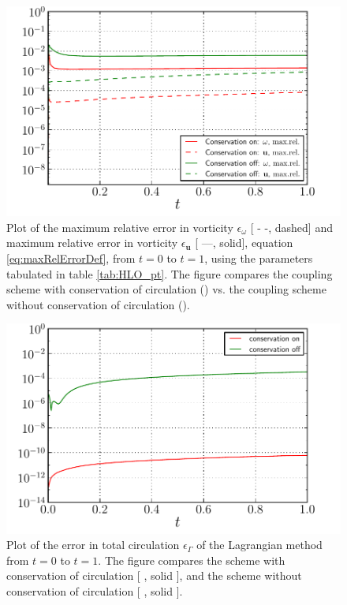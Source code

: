 	\begin{figure}[!p]
	\centering
	\includegraphics[width=0.6\linewidth]{./figures/validation/lambOseent2/lambOseen_comparision_conservation_compressed.pdf}
	\caption{Plot of the maximum relative error in vorticity $\epsilon_{\omega}$ [ - -, dashed] and maximum relative error in vorticity $\epsilon_{\mathbf{u}}$ [ ---, solid], equation \ref{eq:maxRelErrorDef}, from $t=0$ to $t=1$, using the parameters tabulated in table \ref{tab:HLO_pt}. The figure compares the coupling scheme with conservation of circulation ({}) vs. the coupling scheme without conservation of circulation ({}).}
	\label{fig:lambOseen_comparision_conservation}
	\end{figure}	

	\begin{figure}[!p]
	\centering
	\includegraphics[width=0.6\linewidth]{./figures/validation/lambOseent2/lambOseen_comparision_conservation_circulation_compressed.pdf}
	\caption{Plot of the error in total circulation $\epsilon_{\Gamma}$ of the Lagrangian method from $t=0$ to $t=1$. The figure compares the scheme with conservation of circulation [ {\color{plotRed}{\textbf{---}}}, solid {}], and the scheme without conservation of circulation [ {\color{plotGreen}{\textbf{---}}}, solid {}].}
	\label{fig:lambOseen_comparision_conservation_circulation}
	\end{figure}	

